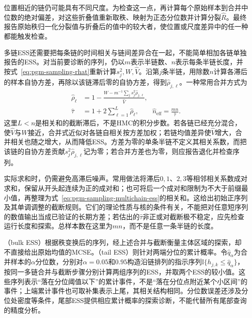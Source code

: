 位置相近的链仍可能具有不同尺度。为检查这一点，再计算每个原始样本到合并中位数的绝对偏差，对这些折叠值重新取秩、映射为正态分位数并计算分裂$\widehat R$。最终报告原始秩归一化分裂值与折叠后的值中的较大者，使位置或尺度差异中的任一种都能触发检查。

多链ESS还需要把每条链的时间相关与链间差异合在一起，不能简单相加各链单独报告的ESS。对当前要诊断的序列，仍以$m$表示半链数、$n$表示每条半链长度，并按式~\eqref{eq:pgm-sampling-rhat}重新计算$s_j^2,W,\widehat V$。沿第$j$条半链，用除数$n$计算各滞后的样本自协方差，再除以该链滞后零的自协方差，得到$\widehat\rho_{j,\ell}$。一种常用合并方式为
\begin{equation}
  \begin{aligned}
    \widehat\rho_\ell
      &=1-\frac{W-m^{-1}\sum_j s_j^2\widehat\rho_{j,\ell}}
                     {\widehat V},\\
    \widehat\tau&=1+2\sum_{\ell=1}^{L}\widehat\rho_\ell,\qquad
    \widehat n_{\mathrm{eff}}=\frac{mn}{\widehat\tau}.
  \end{aligned}
  \label{eq:pgm-sampling-multichain-ess}
\end{equation}
这里$L<n$是相关和的截断滞后，不是HMC的积分步数。若各链已经充分混合，使$\widehat V$与$W$接近，合并式近似对各链自相关按方差加权；若链均值差异使$\widehat V$增大，合并相关也随之增大，从而降低ESS。方差为零的单条半链不定义其相关系数，而把该链的自协方差贡献$s_j^2\widehat\rho_{j,\ell}$记为零；若合并方差也为零，则应报告退化并检查序列。

实际求和时，仍需避免高滞后噪声。常用做法将滞后$0,1$、$2,3$等相邻相关系数成对求和，保留从开头起连续为正的成对和；也可将后一个成对和限制为不大于前缀最小值，再整理为式~\eqref{eq:pgm-sampling-multichain-ess}的相关和。这给出初始正序列及其单调调整的截断规则。它们的理论性质与核的条件有关，不能把对任意短序列的数值输出当成已验证的长期方差；若估出的$\widehat\tau$非正或对截断极不稳定，应先检查运行长度和探索。总样本数在这里为$mn$，而不是任意一条半链的长度。

（bulk ESS）根据秩变换后的序列，经上述合并与截断衡量主体区域的探索，却不直接给出原始均值的MCSE。（tail ESS）则针对两端分位的累计概率。令$\widehat q_\alpha$为合并样本的$\alpha$分位数，分别对$\alpha=0.05$和$0.95$构造沿链排列的指示序列$\mathbb{I}\{h_{j,k}\leq\widehat q_\alpha\}$，按同一多链合并与截断步骤分别计算两组序列的ESS，并取两个ESS的较小值。这些序列表示“落在分位阈值以下”的累计事件，不是“落在分位点附近某个小区间”的事件；上端累计事件也可取补集表示上尾，其相关结构相同。分位数误差还涉及分位处密度等条件，尾部ESS提供相应累计概率的探索诊断，不能代替所有尾部查询的精度分析。

